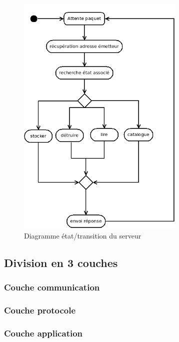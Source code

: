 \documentclass[10pt,a4paper]{article}
\begin{document}
\begin{figure}[H]
 \centering
 \includegraphics[width=8cm]{Diagramme3}
 \caption{Diagramme état/transition du serveur}
\end{figure}

\subsection{Division en 3 couches}

\subsubsection{Couche communication} \label{sec:communication}
\subsubsection{Couche protocole}
\subsubsection{Couche application}
\end{document}
